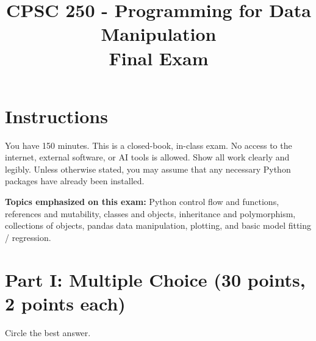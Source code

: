 \documentclass[12pt]{article}
\title{CPSC 250 - Programming for Data Manipulation\\Final Exam}
\date{}
\begin{document}
\maketitle

\section*{Instructions}
You have 150 minutes. This is a closed-book, in-class exam. No access to the internet, external software, or AI tools is allowed. Show all work clearly and legibly. Unless otherwise stated, you may assume that any necessary Python packages have already been installed.

\vspace{0.25in}
\noindent\textbf{Topics emphasized on this exam:} Python control flow and functions, references and mutability, classes and objects, inheritance and polymorphism, collections of objects, pandas data manipulation, plotting, and basic model fitting / regression.

\newpage

\section*{Part I: Multiple Choice (30 points, 2 points each)}
Circle the best answer.
\end{document}
